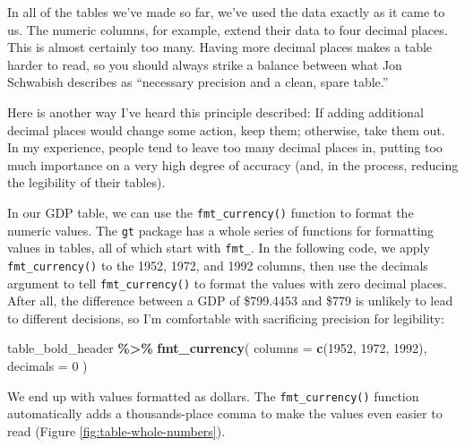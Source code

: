 \documentclass[
]{book}
\newenvironment{Shaded}{\begin{snugshade}}{\end{snugshade}}
\newcommand{\AttributeTok}[1]{\textcolor[rgb]{0.13,0.29,0.53}{#1}}
\newcommand{\DecValTok}[1]{\textcolor[rgb]{0.00,0.00,0.81}{#1}}
\newcommand{\FunctionTok}[1]{\textcolor[rgb]{0.13,0.29,0.53}{\textbf{#1}}}
\newcommand{\NormalTok}[1]{#1}
\newcommand{\SpecialCharTok}[1]{\textcolor[rgb]{0.81,0.36,0.00}{\textbf{#1}}}
\newcommand{\StringTok}[1]{\textcolor[rgb]{0.31,0.60,0.02}{#1}}
\begin{document}
In all of the tables we've made so far, we've used the data exactly as it came to us. The numeric columns, for example, extend their data to four decimal places. This is almost certainly too many. Having more decimal places makes a table harder to read, so you should always strike a balance between what Jon Schwabish describes as ``necessary precision and a clean, spare table.''

Here is another way I've heard this principle described: If adding additional decimal places would change some action, keep them; otherwise, take them out. In my experience, people tend to leave too many decimal places in, putting too much importance on a very high degree of accuracy (and, in the process, reducing the legibility of their tables).

In our GDP table, we can use the \texttt{fmt\_currency()} function to format the numeric values. The \texttt{gt} package has a whole series of functions for formatting values in tables, all of which start with \texttt{fmt\_}. In the following code, we apply \texttt{fmt\_currency()} to the 1952, 1972, and 1992 columns, then use the decimals argument to tell \texttt{fmt\_currency()} to format the values with zero decimal places. After all, the difference between a GDP of \$799.4453 and \$779 is unlikely to lead to different decisions, so I'm comfortable with sacrificing precision for legibility:

\begin{Shaded}
\begin{Highlighting}[]
\NormalTok{table\_bold\_header }\SpecialCharTok{\%\textgreater{}\%}
  \FunctionTok{fmt\_currency}\NormalTok{(}
    \AttributeTok{columns =} \FunctionTok{c}\NormalTok{(}\StringTok{\textasciigrave{}}\AttributeTok{1952}\StringTok{\textasciigrave{}}\NormalTok{, }\StringTok{\textasciigrave{}}\AttributeTok{1972}\StringTok{\textasciigrave{}}\NormalTok{, }\StringTok{\textasciigrave{}}\AttributeTok{1992}\StringTok{\textasciigrave{}}\NormalTok{),}
    \AttributeTok{decimals =} \DecValTok{0}
\NormalTok{  )}
\end{Highlighting}
\end{Shaded}

We end up with values formatted as dollars. The \texttt{fmt\_currency()} function automatically adds a thousands-place comma to make the values even easier to read (Figure \ref{fig:table-whole-numbers}).
\end{document}
